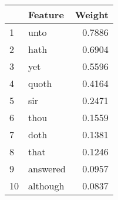 \begin{tabular}{llr}
\toprule
{} &   Feature &  Weight \\
\midrule
1  &      unto &  0.7886 \\
2  &      hath &  0.6904 \\
3  &       yet &  0.5596 \\
4  &     quoth &  0.4164 \\
5  &       sir &  0.2471 \\
6  &      thou &  0.1559 \\
7  &      doth &  0.1381 \\
8  &      that &  0.1246 \\
9  &  answered &  0.0957 \\
10 &  although &  0.0837 \\
\bottomrule
\end{tabular}
